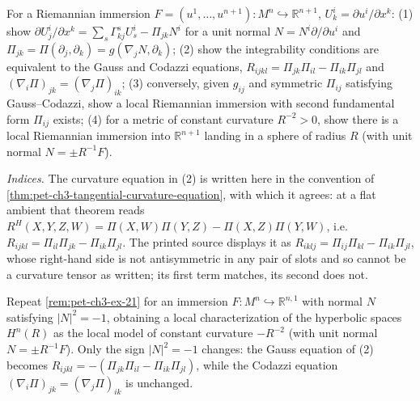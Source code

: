 \begin{remark}
  \label{rem:pet-ch3-ex-21}


  For a Riemannian immersion $F=(u^1,\dots,u^{n+1}):M^n\hookrightarrow\mathbb
  R^{n+1}$, $U^i_k=\partial u^i/\partial x^k$: (1) show
  $\partial U^i_j/\partial x^k=\sum_s\Gamma^s_{kj}U^i_s-\Pi_{jk}N^i$ for a unit normal
  $N=N^i\partial/\partial u^i$ and $\Pi_{jk}=\Pi(\partial_j,\partial_k)=g(\nabla_jN,\partial_k)$;
  (2) show the integrability conditions are equivalent to the Gauss and Codazzi
  equations, $R_{ijkl}=\Pi_{jk}\Pi_{il}-\Pi_{ik}\Pi_{jl}$ and
  $(\nabla_i\Pi)_{jk}=(\nabla_j\Pi)_{ik}$; (3) conversely, given
  $g_{ij}$ and symmetric $\Pi_{ij}$ satisfying Gauss--Codazzi, show a local
  Riemannian immersion with second fundamental form $\Pi_{ij}$ exists; (4) for a
  metric of constant curvature $R^{-2}>0$, show there is a local Riemannian
  immersion into $\mathbb R^{n+1}$ landing in a sphere of radius $R$ (with unit
  normal $N=\pm R^{-1}F$).

  \emph{Indices.} The curvature equation in (2) is written here in the convention
  of \cref{thm:pet-ch3-tangential-curvature-equation}, with which it agrees: at a
  flat ambient that theorem reads $R^H(X,Y,Z,W)=\Pi(X,W)\Pi(Y,Z)-\Pi(X,Z)\Pi(Y,W)$,
  i.e. $R_{ijkl}=\Pi_{il}\Pi_{jk}-\Pi_{ik}\Pi_{jl}$. The printed source displays
  it as $R_{iklj}=\Pi_{ij}\Pi_{kl}-\Pi_{ik}\Pi_{jl}$, whose right-hand side is not
  antisymmetric in any pair of slots and so cannot be a curvature tensor as
  written; its first term matches, its second does not.
\end{remark}

\begin{remark}
  \label{rem:pet-ch3-ex-22}


  Repeat \cref{rem:pet-ch3-ex-21} for an immersion $F:M^n\hookrightarrow\mathbb
  R^{n,1}$ with normal $N$ satisfying $|N|^2=-1$, obtaining a local
  characterization of the hyperbolic spaces $H^n(R)$ as the local model of
  constant curvature $-R^{-2}$ (with unit normal $N=\pm R^{-1}F$). Only the sign
  $|N|^2=-1$ changes: the Gauss equation of (2) becomes
  $R_{ijkl}=-(\Pi_{jk}\Pi_{il}-\Pi_{ik}\Pi_{jl})$, while the Codazzi equation
  $(\nabla_i\Pi)_{jk}=(\nabla_j\Pi)_{ik}$ is unchanged.
\end{remark}

